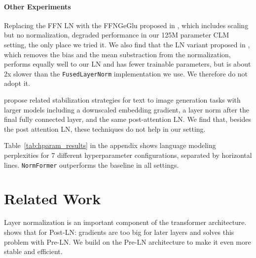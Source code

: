 \documentclass{article} %
\begin{document}
\paragraph{Other Experiments}
Replacing the FFN LN with the FFNGeGlu proposed in \citet{shazeer2020glu}, which includes scaling but no normalization, degraded performance in our 125M parameter CLM setting, the only place we tried it. We also find that the LN variant proposed in \citet{raffel2020exploring}, which removes the bias and the mean substraction from the normalization, performs equally well to our LN and has fewer trainable parameters, but is about 2x slower than the \texttt{FusedLayerNorm} implementation we use. We therefore do not adopt it.

\citet{ding2021cogview} propose related stabilization strategies for text to image generation tasks with larger models including a downscaled embedding gradient, a layer norm after the final fully connected layer, and the same post-attention LN. We find that, besides the post attention LN, these techniques do not help in our setting.

Table~\ref{tab:hparam_results} in the appendix shows language modeling perplexities for 7 different hyperparameter configurations, separated by horizontal lines.
\texttt{NormFormer} outperforms the baseline in all settings.


\section{Related Work}  
Layer normalization \citep{ba2016layer} is an important component of the transformer architecture.
\citet{xiong2020layer} shows that for Post-LN: gradients are too big for later layers and solves this problem with Pre-LN. We build on the Pre-LN architecture to make it even more stable and efficient.
\end{document}
